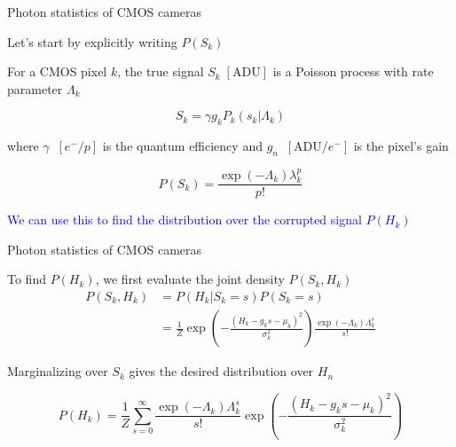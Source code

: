 \documentclass[aspectratio=1610]{beamer}					%
\begin{document}
\begin{frame}{Photon statistics of CMOS cameras}

Let's start by explicitly writing $P(S_{k})$

\vspace{0.2in}
For a CMOS pixel $k$, the true signal $S_{k}\; [\mathrm{ADU}]$ is a Poisson process with rate parameter $\Lambda_{k}$

\begin{equation*}
S_{k} = \gamma g_{k}P_{k}(s_{k}|\Lambda_{k})
\end{equation*}

where $\gamma\;\;[e^{-}/p]$ is the quantum efficiency and $g_{n}\;\; [\mathrm{ADU}/e^{-}]$ is the pixel's gain
\vspace{0.1in}

\begin{equation*}
P(S_{k}) = \frac{\exp\left({-\Lambda_{k}}\right)\lambda_{k}^{p}}{p!}
\end{equation*}

\textcolor{blue}{We can use this to find the distribution over the corrupted signal $P(H_{k})$}


\end{frame}


\begin{frame}{Photon statistics of CMOS cameras}

To find $P(H_{k})$, we first evaluate the joint density $P(S_{k},H_{k})$
\vspace{0.1in}
\begin{align*}
P(S_{k},H_{k}) &= P(H_{k}|S_{k}=s)P(S_{k}=s)\\
&= \frac{1}{Z}\exp\left(-\frac{(H_{k}-g_{k}s-\mu_{k})^{2}}{\sigma_{k}^{2}}\right)\frac{\exp\left({-\Lambda_{k}}\right)\Lambda_{k}^{s}}{s!}
\end{align*}
\vspace{0.1in}

Marginalizing over $S_{k}$ gives the desired distribution over $H_{n}$

\begin{equation*}
P(H_{k}) = \frac{1}{Z}\sum_{s=0}^{\infty}\frac{\exp\left({-\Lambda_{k}}\right)\Lambda_{k}^{s}}{s!}\exp\left(-\frac{(H_{k}-g_{k}s-\mu_{k})^{2}}{\sigma_{k}^{2}}\right)
\end{equation*}

\end{frame}
\end{document}

